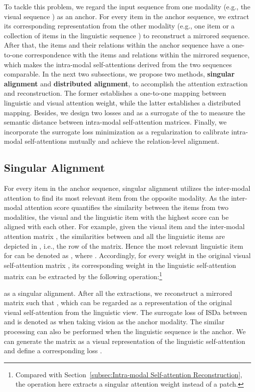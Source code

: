 \documentclass[11pt,a4paper]{article}
\begin{document}
To tackle this problem, we regard the input sequence from one modality (e.g., the visual sequence ) as an anchor.
For every item in the anchor sequence, we extract its corresponding representation from the other modality (e.g., one item or a collection of items in the linguistic sequence ) to reconstruct a mirrored sequence. 
After that, the items and their relations within the anchor sequence have a one-to-one correspondence with the items and relations within the mirrored sequence, 
which makes the intra-modal self-attentions derived from the two sequences comparable. 
In the next two subsections, we propose two methods, \textbf{singular alignment} and \textbf{distributed alignment}, to accomplish the attention extraction and reconstruction. 
The former establishes a one-to-one mapping between linguistic and visual attention weight, while the latter establishes a distributed mapping.
Besides, we design two losses  and  as a surrogate of the  to measure the semantic distance between intra-modal self-attention matrices. 
Finally, we incorporate the surrogate loss minimization as a regularization to calibrate intra-modal self-attentions mutually and achieve the relation-level alignment.


\subsection{Singular Alignment}
For every item in the anchor sequence, singular alignment utilizes the inter-modal attention to find its most relevant item from the opposite modality.  
As the inter-modal attention score quantifies the similarity between the items from two modalities, the visual and the linguistic item with the highest score can be aligned with each other. 
For example, given the  visual item  and the inter-modal attention matrix , the similarities between  and all the linguistic items are depicted in , i.e., the  row of the matrix. 
Hence the most relevant linguistic item for  can be denoted as , where . 
Accordingly, for every weight  in the original visual self-attention matrix , its corresponding weight  in the linguistic self-attention matrix  can be extracted by the following operation:\footnote{Compared with Section~\ref{subsec:Intra-modal Self-attention Reconstruction}, the  operation here extracts a singular attention weight instead of a patch.} 

as a singular alignment.
After all the extractions, we reconstruct a mirrored matrix  such that , which can be regarded as a representation of the original visual self-attention  from the linguistic view. 
The surrogate loss of ISDa between  and  is denoted as  when taking vision as the anchor modality. 
The similar processing can also be performed when the linguistic sequence is the anchor. We can generate the matrix  as a visual representation of the linguistic self-attention  and define a corresponding loss . 
\end{document}
